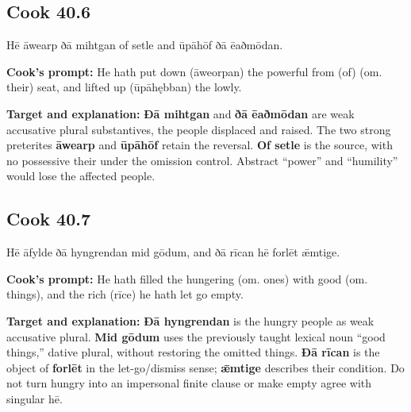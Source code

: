 \par\begin{minipage}{\linewidth}\raggedright
\subsection*{Cook 40.6}

Hē āwearp ðā mihtgan of setle and ūpāhōf ðā ēaðmōdan.

\textbf{Cook's prompt:} He hath put down (āweorpan) the powerful from (of) (om. their) seat, and lifted up (ūpāhębban) the lowly.

\textbf{Target and explanation:} \textbf{Ðā mihtgan} and \textbf{ðā ēaðmōdan} are weak accusative plural substantives, the people displaced and raised. The two strong preterites \textbf{āwearp} and \textbf{ūpāhōf} retain the reversal. \textbf{Of setle} is the source, with no possessive their under the omission control. Abstract “power” and “humility” would lose the affected people.

\end{minipage}\par\addvspace{4pt}

\par\begin{minipage}{\linewidth}\raggedright
\subsection*{Cook 40.7}

Hē āfylde ðā hyngrendan mid gōdum, and ðā rīcan hē forlēt ǣmtige.

\textbf{Cook's prompt:} He hath filled the hungering (om. ones) with good (om. things), and the rich (rīce) he hath let go empty.

\textbf{Target and explanation:} \textbf{Ðā hyngrendan} is the hungry people as weak accusative plural. \textbf{Mid gōdum} uses the previously taught lexical noun “good things,” dative plural, without restoring the omitted things. \textbf{Ðā rīcan} is the object of \textbf{forlēt} in the let-go/\allowbreak{}dismiss sense; \textbf{ǣmtige} describes their condition. Do not turn hungry into an impersonal finite clause or make empty agree with singular hē.

\end{minipage}\par\addvspace{4pt}

